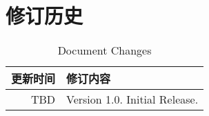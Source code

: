 
\chapter{修订历史}

\begin{table}[h]
  \centering
  \begin{tabularx}{0.9\textwidth}{ r X }
    \toprule
    \textbf{更新时间} & \textbf{修订内容}\\\midrule
    TBD & Version 1.0. Initial Release.\\
    \bottomrule
  \end{tabularx}
  \caption{Document Changes}
\label{table:DocumentChanges}
\end{table}
